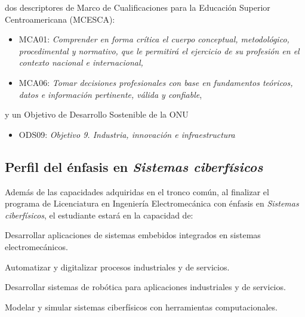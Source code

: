 dos descriptores de Marco de Cualificaciones para la Educación Superior Centroamericana (MCESCA):\par

\begin{itemize}
\item MCA01: \textit{Comprender en forma crítica el cuerpo conceptual, metodológico, procedimental y normativo, que le permitirá el ejercicio de su profesión en el contexto nacional e internacional,}
\item MCA06: \textit{Tomar decisiones profesionales con base en fundamentos teóricos, datos e información pertinente, válida y confiable},
\end{itemize}
y un Objetivo de Desarrollo Sostenible de la ONU\par

\begin{itemize}
\item ODS09: \textit{Objetivo 9. Industria, innovación e infraestructura}
\end{itemize}
\subsection*{Perfil del énfasis en \textit{Sistemas ciberfísicos}}

Además de las capacidades adquiridas en el tronco común, al finalizar el programa de Licenciatura en Ingeniería Electromecánica con énfasis en \textit{Sistemas ciberfísicos}, el estudiante estará en la capacidad de:\par

\begin{cuadroazul}[SCF01]
Desarrollar aplicaciones de sistemas embebidos integrados en sistemas electromecánicos.
\end{cuadroazul}

\begin{cuadroazul}[SCF02]
Automatizar y digitalizar procesos industriales y de servicios.
\end{cuadroazul}

\begin{cuadroazul}[SCF03]
Desarrollar sistemas de robótica para aplicaciones industriales y de servicios.
\end{cuadroazul}

\begin{cuadroazul}[SCF04]
Modelar y simular sistemas ciberfísicos con herramientas computacionales.
\end{cuadroazul}

